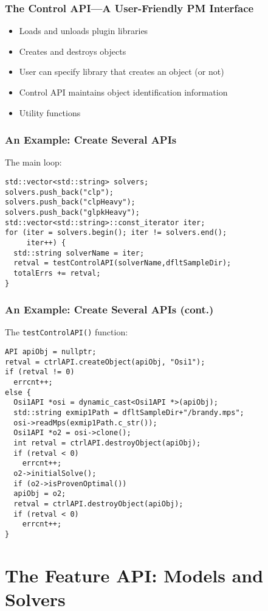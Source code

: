 \documentclass{beamer}
\begin{document}
\begin{frame}
  \frametitle{The Control API---A User-Friendly PM Interface}

  \begin{itemize}
  \item Loads and unloads plugin libraries
  \item Creates and destroys objects
  \item User can specify library that creates an object (or not)
  \item Control API maintains object identification information
  \item Utility functions
  \end{itemize}
\end{frame}

\begin{frame}[fragile]
  \frametitle{An Example: Create Several APIs}

  The main loop:
  \small
\begin{lstlisting}
std::vector<std::string> solvers;
solvers.push_back("clp");
solvers.push_back("clpHeavy");
solvers.push_back("glpkHeavy");
std::vector<std::string>::const_iterator iter;
for (iter = solvers.begin(); iter != solvers.end(); 
     iter++) {
  std::string solverName = iter;
  retval = testControlAPI(solverName,dfltSampleDir);
  totalErrs += retval;
}
\end{lstlisting}
\end{frame}

\begin{frame}[fragile]
  \frametitle{An Example: Create Several APIs (cont.)}

  The \lstinline|testControlAPI()| function:
  \small
\begin{lstlisting}
API apiObj = nullptr;
retval = ctrlAPI.createObject(apiObj, "Osi1");
if (retval != 0)
  errcnt++;
else {
  Osi1API *osi = dynamic_cast<Osi1API *>(apiObj);
  std::string exmip1Path = dfltSampleDir+"/brandy.mps";
  osi->readMps(exmip1Path.c_str());
  Osi1API *o2 = osi->clone();
  int retval = ctrlAPI.destroyObject(apiObj);
  if (retval < 0)
    errcnt++;
  o2->initialSolve();
  if (o2->isProvenOptimal())
  apiObj = o2;
  retval = ctrlAPI.destroyObject(apiObj);
  if (retval < 0)
    errcnt++;
}
\end{lstlisting}
\end{frame}

\section{The Feature API: Models and Solvers}
\end{document}

